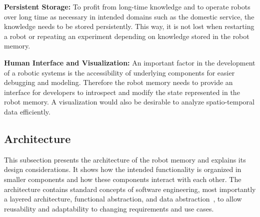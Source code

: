 \documentclass[a4paper,11pt]{article}
\begin{document}
\smallskip
\textbf{Persistent Storage:} To profit from long-time knowledge and to
operate robots over long time as necessary in intended domains
such as the domestic service, the knowledge needs to be stored
persistently. This way, it is not lost when restarting a robot or
repeating an experiment depending on knowledge stored in the robot
memory.

\smallskip
\textbf{Human Interface and Visualization:} An important factor in the
development of a robotic systems is the accessibility of underlying
components for easier debugging and modeling. Therefore the robot
memory needs to provide an interface for developers to introspect and
modify the state represented in the robot memory. A visualization
would also be desirable to analyze spatio-temporal data efficiently.


\subsection{Architecture}
\label{sec:arch}
This subsection presents the architecture of the robot memory and
explains its design considerations. It shows how the intended
functionality is organized in smaller components and how these
components interact with each other. The architecture contains
standard concepts of software engineering, most importantly a layered
architecture, functional abstraction, and data
abstraction~\cite{software-architecture}, to allow reusability and
adaptability to changing requirements and use cases.
\end{document}
